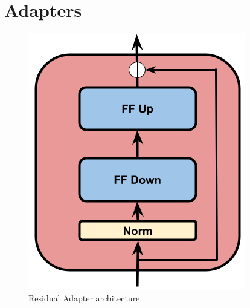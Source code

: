 

\section{Adapters}

\begin{figure}[t]
    \begin{center}
    \includegraphics[scale=0.3]{imgs/Adapter_alone.png}
    \caption{Residual Adapter architecture}
    \label{fig:Adapter_architecture}
    \end{center}
    \end{figure}


